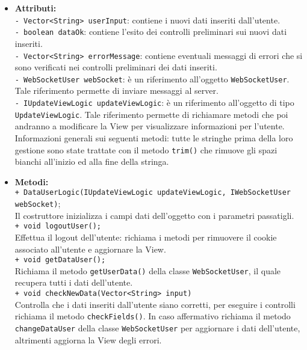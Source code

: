 {{\begin{sloppypar}
{{{\begin{itemize}
				\item[] \textbf{Attributi:}\\
				\texttt{- Vector<String> userInput}: contiene i nuovi dati inseriti dall'utente.\\
				
				\texttt{- boolean dataOk}: contiene l'esito dei controlli preliminari sui nuovi dati inseriti.\\
				
				\texttt{- Vector<String> errorMessage}: contiene eventuali messaggi di errori che si sono verificati nei controlli preliminari dei dati inseriti.\\
					\texttt{- WebSocketUser webSocket}: è un riferimento all'oggetto \texttt{WebSocketUser}. Tale riferimento permette di inviare messaggi al server\g.\\
					
					\texttt{- IUpdateViewLogic updateViewLogic}: è un riferimento all'oggetto di tipo \texttt{UpdateViewLogic}. Tale riferimento permette di richiamare metodi che poi andranno a modificare la View per visualizzare informazioni per l'utente.\\

				Informazioni generali sui seguenti metodi: tutte le stringhe prima della loro gestione sono state trattate con il metodo \texttt{trim()} che rimuove gli spazi bianchi all'inizio ed alla fine della stringa.
			
				\item[] \textbf{Metodi:}{\\
					\texttt{+ DataUserLogic(IUpdateViewLogic updateViewLogic, IWebSocketUser webSocket)};\\
					Il costruttore inizializza i campi dati dell'oggetto con i parametri passatigli.\\
					
					\texttt{+ void logoutUser();}\\
					Effettua il logout dell'utente: richiama i metodi per rimuovere il cookie\g~ associato all'utente e aggiornare la View.\\
					
					\texttt{+ void getDataUser();}\\
					Richiama il metodo \texttt{getUserData()} della classe \texttt{WebSocketUser}, il quale recupera tutti i dati dell'utente.\\
					
					\texttt{+ void checkNewData(Vector<String> input)}\\
					Controlla che i dati inseriti dall'utente siano corretti, per eseguire i controlli richiama il metodo \texttt{checkFields()}. In caso affermativo richiama il metodo \texttt{changeDataUser} della classe \texttt{WebSocketUser} per aggiornare i dati dell'utente, altrimenti aggiorna la View degli errori.\\
					
}
\end{itemize}}}}
\end{sloppypar}}}
